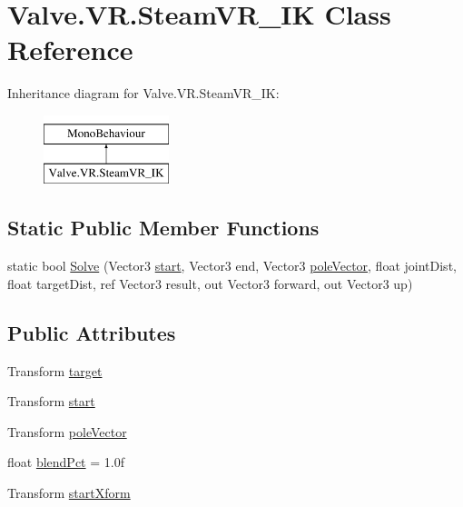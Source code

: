 \hypertarget{class_valve_1_1_v_r_1_1_steam_v_r___i_k}{}\section{Valve.\+V\+R.\+Steam\+V\+R\+\_\+\+IK Class Reference}
\label{class_valve_1_1_v_r_1_1_steam_v_r___i_k}
Inheritance diagram for Valve.\+V\+R.\+Steam\+V\+R\+\_\+\+IK\+:\begin{figure}[H]
\begin{center}
\leavevmode
\includegraphics[height=2.000000cm]{class_valve_1_1_v_r_1_1_steam_v_r___i_k}
\end{center}
\end{figure}
\subsection*{Static Public Member Functions}
\begin{DoxyCompactItemize}
\item 
static bool \mbox{\hyperlink{class_valve_1_1_v_r_1_1_steam_v_r___i_k_acacd1e3c67856323c56dc189cc5e1285}{Solve}} (Vector3 \mbox{\hyperlink{class_valve_1_1_v_r_1_1_steam_v_r___i_k_aee03deee31f4a7b8793530b87d2e5ab6}{start}}, Vector3 end, Vector3 \mbox{\hyperlink{class_valve_1_1_v_r_1_1_steam_v_r___i_k_a0c7eca956f472c30f082ad6f671baa3c}{pole\+Vector}}, float joint\+Dist, float target\+Dist, ref Vector3 result, out Vector3 forward, out Vector3 up)
\end{DoxyCompactItemize}
\subsection*{Public Attributes}
\begin{DoxyCompactItemize}
\item 
Transform \mbox{\hyperlink{class_valve_1_1_v_r_1_1_steam_v_r___i_k_ae00d693d3094a77dff1231324c32b193}{target}}
\item 
Transform \mbox{\hyperlink{class_valve_1_1_v_r_1_1_steam_v_r___i_k_aee03deee31f4a7b8793530b87d2e5ab6}{start}}
\item 
Transform \mbox{\hyperlink{class_valve_1_1_v_r_1_1_steam_v_r___i_k_a0c7eca956f472c30f082ad6f671baa3c}{pole\+Vector}}
\item 
float \mbox{\hyperlink{class_valve_1_1_v_r_1_1_steam_v_r___i_k_a142f297ba00068b83b2285f7cad44eea}{blend\+Pct}} = 1.\+0f
\item 
Transform \mbox{\hyperlink{class_valve_1_1_v_r_1_1_steam_v_r___i_k_aaa82d10575adf97342da4875673f1155}{start\+Xform}}
\end{DoxyCompactItemize}



